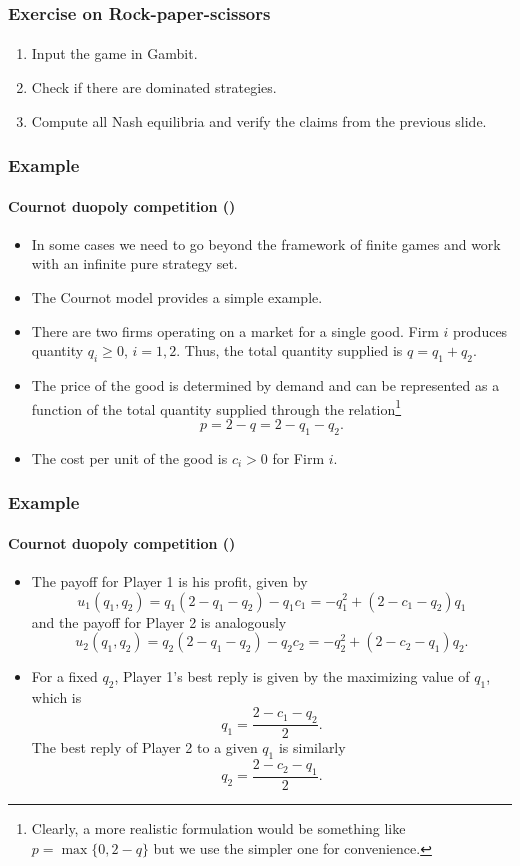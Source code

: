\documentclass[10pt]{beamer}
\theoremstyle{definition}
\begin{document}
\begin{frame}[fragile]
\frametitle{Exercise on Rock-paper-scissors}
\framesubtitle{}
\begin{enumerate}\itemsep1em
\item Input the game in Gambit.
\item Check if there are dominated strategies.
\item Compute all Nash equilibria and verify the claims from the previous slide.
\end{enumerate}
\end{frame}

\begin{frame}[fragile]\setcounter{slidenum}{1}
\frametitle{Example }
\framesubtitle{Cournot duopoly competition ()}
\begin{itemize}\itemsep1em
\item In some cases we need to go beyond the framework of finite games and work with an infinite pure strategy set. 
\item The Cournot model provides a simple example.
\item There are two firms operating on a market for a single good. Firm $ i $ produces quantity $ q_i \geq 0$, $ i=1,2 $. Thus, the total quantity supplied is $ q =  q_1 + q_2 $.
\item The price of the good is determined by demand and can be represented as a function of the total quantity supplied through the relation\footnote{Clearly, a more realistic formulation would be something like $ p = \max\{0,2-q\} $ but we use the simpler one for convenience.}
\[ p = 2 - q = 2 - q_1 - q_2. \]
\item The cost per unit of the good is $ c_i > 0 $ for Firm $ i $.
\end{itemize}
\end{frame}



\begin{frame}[fragile]
\frametitle{Example }
\framesubtitle{Cournot duopoly competition ()}
\begin{itemize}\itemsep1em
\item The payoff for Player 1 is his profit, given by 
\[ u_1(q_1,q_2) = q_1 (2-q_1-q_2) - q_1 c_1 = -q_1^2 + (2-c_1-q_2)q_1 \] and the payoff for Player 2 is analogously 
\[ u_2(q_1,q_2) = q_2 (2-q_1-q_2) - q_2 c_2 = -q_2^2 + (2-c_2-q_1)q_2 .\]
\item For a fixed $ q_2 $, Player 1's best reply is given by the maximizing value of $ q_1 $, which is \begin{equation}
q_1 = \frac{2-c_1-q_2}{2}.
\label{eq:CournotBR1}
\end{equation} The best reply of Player 2 to a given $ q_1 $ is similarly \begin{equation}
q_2 = \frac{2-c_2-q_1}{2} .
\label{eq:CournotBR2}
\end{equation} 
\end{itemize}
\end{frame}
\end{document}
